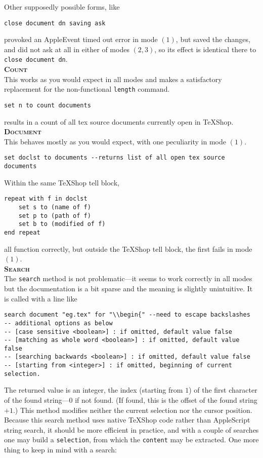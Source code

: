 \documentclass[11pt]{amsart}
\begin{document}
Other supposedly possible forms, like
\begin{verbatim}
close document dn saving ask
\end{verbatim}
provoked an AppleEvent timed out error in mode $(1)$, but saved the changes, and did not ask at all in either of modes $(2,3)$, so its effect is identical there to
\verb|close document dn|.\\[6pt]
\textbf{\textsc{Count}}\\[3pt]
This works as you would expect in all modes and makes a satisfactory replacement for the non-functional {\tt length} command.
\begin{verbatim}
set n to count documents
\end{verbatim}
results in a count of all tex source documents currently open in TeXShop.\\[3pt]
\textbf{\textsc{Document}}\\[3pt]
This behaves mostly as you would expect, with one peculiarity in mode $(1)$.
\begin{verbatim}
set doclst to documents --returns list of all open tex source documents
\end{verbatim}
Within the same TeXShop tell block,
\begin{verbatim}
repeat with f in doclst
    set s to (name of f)
    set p to (path of f)
    set b to (modified of f)
end repeat
\end{verbatim}
all function correctly, but outside the TeXShop tell block, the first fails in mode $(1)$.\\[3pt]
\textbf{\textsc{Search}}\nopagebreak[4]\\[3pt]
The {\tt search} method is not problematic---it seems to work correctly in all modes but the documentation is a bit sparse and the meaning is slightly unintuitive.  It is called with a line like
\begin{verbatim}
search document "eg.tex" for "\\begin{" --need to escape backslashes
-- additional options as below
-- [case sensitive <boolean>] : if omitted, default value false
-- [matching as whole word <boolean>] : if omitted, default value false
-- [searching backwards <boolean>] : if omitted, default value false
-- [starting from <integer>] : if omitted, beginning of current selection.
\end{verbatim}
The returned value is an integer, the index (starting from $1$) of the first character of the found string---$0$ if not found. (If found, this is the offset of the found string $+1$.) This method modifies neither the current selection nor the cursor position. Because this search method uses native TeXShop code rather than AppleScript string search, it should be more efficient in practice, and with a couple of searches one may build a {\tt selection}, from which the {\tt content} may be extracted. One more thing to keep in mind with a search:
\end{document}
